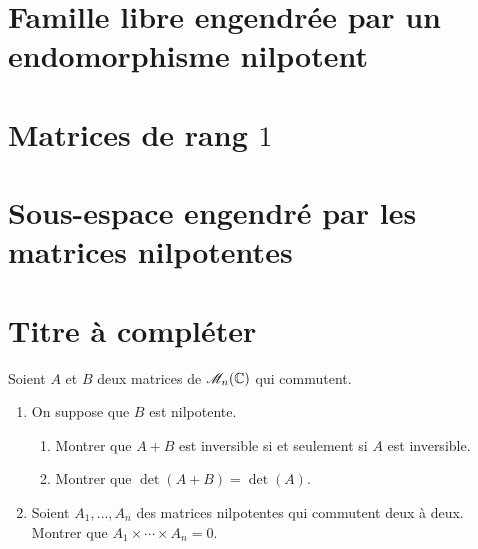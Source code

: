 \section{Famille libre engendrée par un endomorphisme nilpotent} 


\section{Matrices de rang $1$}


\section{Sous-espace engendré par les matrices nilpotentes} 


\section{Titre à compléter} 
\begin{exercice}
    \cite{acamanes} 
    Soient $A$ et $B$ deux matrices de $\mathscr{M}_n(\mathbb{C})$ qui commutent. 
    \begin{enumerate}
        \item On suppose que $B$ est nilpotente. 
        \begin{enumerate}
            \item Montrer que $A + B$ est inversible si et seulement si $A$ est inversible.
            \item Montrer que $\det(A+B) = \det(A)$.
        \end{enumerate}
        \item Soient $A_1, \dots, A_n$ des matrices nilpotentes qui commutent deux à deux. Montrer que $A_1 \times \cdots \times A_n = 0$.
    \end{enumerate}
\end{exercice}

